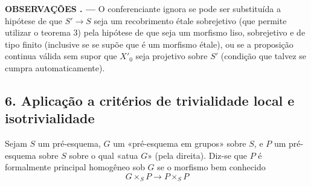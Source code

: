 \documentclass[11pt,twoside,openany]{book}
\numberwithin{equation}{section}
\theoremstyle{plain}
\theoremstyle{definition}
\theoremstyle{remark}
\newcommand{\result}[2]{%
  \par\medskip\noindent\textbf{#1%
  \if\relax\detokenize{#2}\relax\else\space#2\fi. ---}\enspace
}
\begin{document}
\result{OBSERVAÇÕES}{} O conferenciante ignora se pode ser substituída a
hipótese de que $S'\longrightarrow S$ seja um recobrimento étale sobrejetivo
(que permite utilizar o teorema 3) pela hipótese de que seja um morfismo
liso, sobrejetivo e de tipo finito (inclusive se se supõe que é um morfismo
étale), ou se a proposição continua válida sem supor que $X'_0$ seja
projetivo sobre $S'$ (condição que talvez se cumpra automaticamente).

\subsection*{6. Aplicação a critérios de trivialidade local e isotrivialidade}

Sejam $S$ um pré-esquema, $G$ um «pré-esquema em grupos» sobre $S$, e $P$ um
pré-esquema sobre $S$ sobre o qual «atua $G$» (pela direita). Diz-se que $P$
é formalmente principal homogêneo sob $G$ se o morfismo bem conhecido
\[
  G\times_SP\longrightarrow P\times_SP
\]
\end{document}
